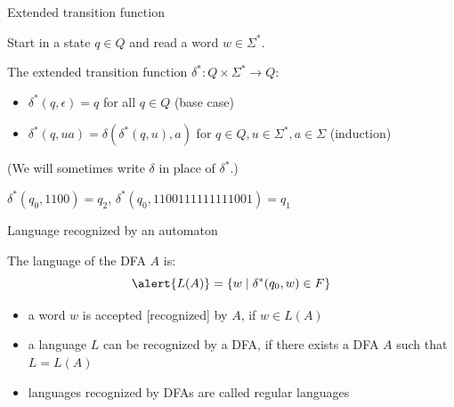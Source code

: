 \documentclass[handout]{beamer}
\begin{document}
\begin{frame}{Extended transition function}

    Start in a state $q\in Q$ and read a  \alert{word $w\in \Sigma^*$}.

    \begin{definition}
        The \alert{extended transition function } $\delta^*\colon Q\times \Sigma^*\rightarrow Q$:

        \begin{itemize}
            \item $\delta^*(q,\epsilon)=q$ for all $q\in Q$ \hfill (base case)
            \item $\delta^*(q,ua)=\delta(\delta^*(q,u),a)$ for $q\in Q,u\in \Sigma^*,a\in \Sigma$ \hfill (induction)
        \end{itemize}

        (We will sometimes write $\delta$ in place of $\delta^*$.)
    \end{definition}

    \begin{example}
        $\delta^*(q_0,1100)=q_2$, $\delta^*(q_0,1100111111111001)=q_1$ 
    \end{example}
    \begin{center}
    \end{center}

\end{frame}


\begin{frame}{Language recognized by an automaton}
    
    \begin{definition}
        The language of the DFA $A$ is: 
        $$
        \alert{L(A)}=\{w\mid\delta^*(q_0,w)\in F\}
        $$
        \begin{itemize}
        \item a word $w$ is \alert{accepted [recognized]} by $A$, if $w\in L(A)$
        \item a language $L$ can be \alert{recognized} by a DFA, if there exists a DFA $A$ such that $L=L(A)$
        \item languages recognized by DFAs are called \alert{regular languages}
        \end{itemize}
    \end{definition}   

\end{frame}
\end{document}
